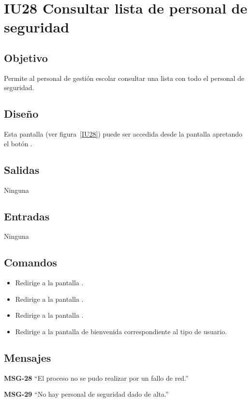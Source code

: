
\section{IU28 Consultar lista de personal de seguridad}
\subsection{Objetivo}
   Permite al personal de gestión escolar consultar una lista con todo el personal de seguridad.
\subsection{Diseño}
    Esta pantalla  (ver figura~\ref{IU28}) puede ser accedida desde la pantalla  apretando el botón .

\subsection{Salidas}
Ninguna
\subsection{Entradas}
Ninguna
\subsection{Comandos}
\begin{itemize}
    \item {} Redirige a la pantalla .
    \item {} Redirige a la pantalla .
    \item {} Redirige a la pantalla .
    \item {} Redirige a la pantalla de bienvenida correspondiente al tipo de usuario.
    
\end{itemize}

\subsection{Mensajes}

\begin{Citemize}
    \item {\bf MSG-28}  ``El proceso no se pudo realizar por un fallo de red.''
    \item {\bf MSG-29}  ``No hay personal de seguridad dado de alta.''
    
\end{Citemize}



